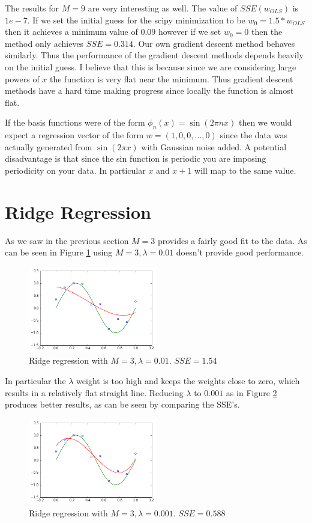 \documentclass{article}
\begin{document}
The results for $M = 9$ are very interesting as well. The value of $SSE(w_{OLS})$ is $1e-7$. If we set the initial guess for the scipy minimization to be $w_0 = 1.5*w_{OLS}$ then it achieves a minimum value of $0.09$ however if we set $w_0 = 0$ then the method only achieves $SSE = 0.314$. Our own gradient descent method behaves similarly. Thus the performance of the gradient descent methods depends heavily on the initial guess. I believe that this is because since we are considering large powers of $x$ the function is very flat near the minimum. Thus gradient descent methods have a hard time making progress since locally the function is almost flat.

If the basis functions were of the form $\phi_n(x)=\sin(2\pi n x)$ then we would expect a regression vector of the form $w = (1,0,0,...,0)$ since the data was actually generated from $\sin(2 \pi x)$ with Gaussian noise added. A potential disadvantage is that since the sin function is periodic you are imposing periodicity on your data. In particular $x $ and $x+1$ will map to the same value.

\section{Ridge Regression}
As we saw in the previous section $M = 3$ provides a fairly good fit to the data. As can be seen in Figure \ref{ridge_m_3_lam_0-01} using $M = 3, \lambda = 0.01$ doesn't provide good performance.

\begin{figure}[h]
\centering
\includegraphics[width=0.5\textwidth]{m_3_lam_0-01}
\caption{Ridge regression with $M = 3, \lambda = 0.01$. $SSE = 1.54$}
\label{ridge_m_3_lam_0-01}
\end{figure} 
In particular the $\lambda$ weight is too high and keeps the weights close to zero, which results in a relatively flat straight line. Reducing $\lambda $ to $0.001$ as in Figure \ref{ridge_m_3_lam_0-001} produces better results, as can be seen by comparing the SSE's.

\begin{figure}[h]
\centering
\includegraphics[width=0.5\textwidth]{m_3_lam_0-001}
\caption{Ridge regression with $M = 3, \lambda = 0.001$. $SSE = 0.588$}
\label{ridge_m_3_lam_0-001}
\end{figure}
\end{document}
